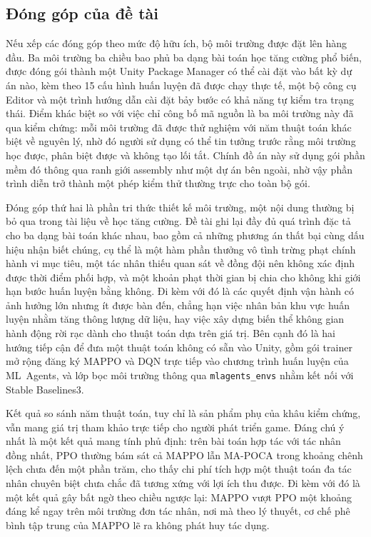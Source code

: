 \subsection{Đóng góp của đề tài}
\indent Nếu xếp các đóng góp theo mức độ hữu ích, bộ môi trường được đặt lên hàng đầu. Ba
môi trường ba chiều bao phủ ba dạng bài toán học tăng cường phổ biến, được đóng gói thành
một Unity Package Manager có thể cài đặt vào bất kỳ dự án nào, kèm theo 15 cấu hình
huấn luyện đã được chạy thực tế, một bộ công cụ Editor và một trình hướng dẫn cài đặt bảy
bước có khả năng tự kiểm tra trạng thái. Điểm khác biệt so với việc chỉ công bố mã nguồn
là ba môi trường này đã qua kiểm chứng: mỗi môi trường đã được thử nghiệm với năm thuật
toán khác biệt về nguyên lý, nhờ đó người sử dụng có thể tin tưởng trước rằng môi trường
học được, phân biệt được và không tạo lối tắt. Chính đồ án này sử dụng gói phần mềm đó thông qua ranh giới
assembly như một dự án bên ngoài, nhờ vậy phần trình diễn trở thành một phép kiểm thử
thường trực cho toàn bộ gói.

\indent Đóng góp thứ hai là phần tri thức thiết kế môi trường, một nội dung thường bị bỏ
qua trong tài liệu về học tăng cường. Đề tài ghi lại đầy đủ quá trình đặc tả cho ba dạng
bài toán khác nhau, bao gồm cả những phương án thất bại cùng dấu hiệu nhận biết chúng, cụ
thể là một hàm phần thưởng vô tình trừng phạt chính hành vi mục tiêu, một tác nhân thiếu
quan sát về đồng đội nên không xác định được thời điểm phối hợp, và một khoản phạt thời
gian bị chia cho không khi giới hạn bước huấn luyện bằng không. Đi kèm với đó là các quyết
định vận hành có ảnh hưởng lớn nhưng ít được bàn đến, chẳng hạn việc nhân bản khu vực
huấn luyện nhằm tăng thông lượng dữ liệu, hay việc xây dựng biến thể không gian hành động
rời rạc dành cho thuật toán dựa trên giá trị. Bên cạnh đó là hai hướng tiếp cận để đưa một
thuật toán không có sẵn vào Unity, gồm gói trainer mở rộng đăng ký MAPPO và DQN trực tiếp
vào chương trình huấn luyện của ML~Agents, và lớp bọc môi trường thông qua
\texttt{mlagents\_envs} nhằm kết nối với Stable Baselines3.

\indent Kết quả so sánh năm thuật toán, tuy chỉ là sản phẩm phụ của khâu kiểm chứng, vẫn
mang giá trị tham khảo trực tiếp cho người phát triển game. Đáng chú ý nhất là một kết quả
mang tính phủ định: trên bài toán hợp tác với tác nhân đồng nhất, PPO thường bám sát cả
MAPPO lẫn MA-POCA trong khoảng chênh lệch chưa đến một phần trăm, cho thấy chi phí tích
hợp một thuật toán đa tác nhân chuyên biệt chưa chắc đã tương xứng với lợi ích thu được.
Đi kèm với đó là một kết quả gây bất ngờ theo chiều ngược lại: MAPPO vượt PPO một khoảng
đáng kể ngay trên môi trường đơn tác nhân, nơi mà theo lý thuyết, cơ chế phê bình tập
trung của MAPPO lẽ ra không phát huy tác dụng.


